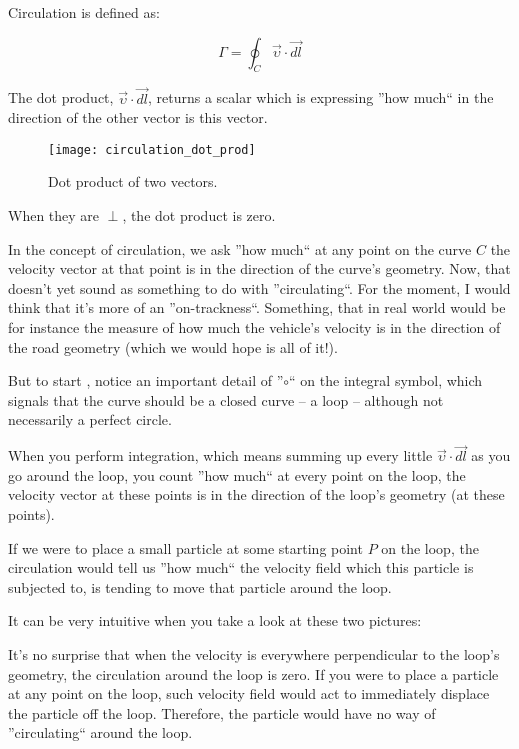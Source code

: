 

Circulation is defined as:

\begin{equation}
\Gamma = \oint_C \vec{\upsilon} \cdot \vec{dl}
\end{equation}

The dot product, $\vec{\upsilon} \cdot \vec{dl}$, returns a scalar which is expressing ''how much`` in the direction of the other vector is this vector.

\begin{figure}[H]
\centering\texttt{[image: circulation\_dot\_prod]}
\caption{Dot product of two vectors.}			
\label{fig:circulation-dot-product}
\end{figure}

When they are $\perp$, the dot product is zero.

In the concept of circulation, we ask ''how much`` at any point on the curve $C$ the velocity vector at that point is in the direction of the curve's geometry. Now, that doesn't yet sound as something to do with ''circulating``. For the moment, I would think that it's more of an ''on-trackness``. Something, that in real world would be for instance the measure of how much the vehicle's velocity is in the direction of the road geometry (which we would hope is all of it!).

But to start 
, notice an important detail of ''$\circ$`` on the integral symbol, which signals that the curve should be a closed curve -- a loop -- although not necessarily a perfect circle.

When you perform integration, which means summing up every little $\vec{\upsilon} \cdot \vec{dl}$ as you go around the loop, you count ''how much`` at every point on the loop, the velocity vector at these points is in the direction of the loop's geometry (at these points).

If we were to place a small particle at some starting point $P$ on the loop, the circulation would tell us ''how much`` the velocity field which this particle is subjected to, is tending to move that particle around the loop.

It can be very intuitive when you take a look at these two pictures:





It's no surprise that when the velocity is everywhere perpendicular to the loop's geometry, the circulation around the loop is zero. If you were to place a particle at any point on the loop, such velocity field would act to immediately displace the particle off the loop. Therefore, the particle would have no way of ''circulating`` around the loop.

